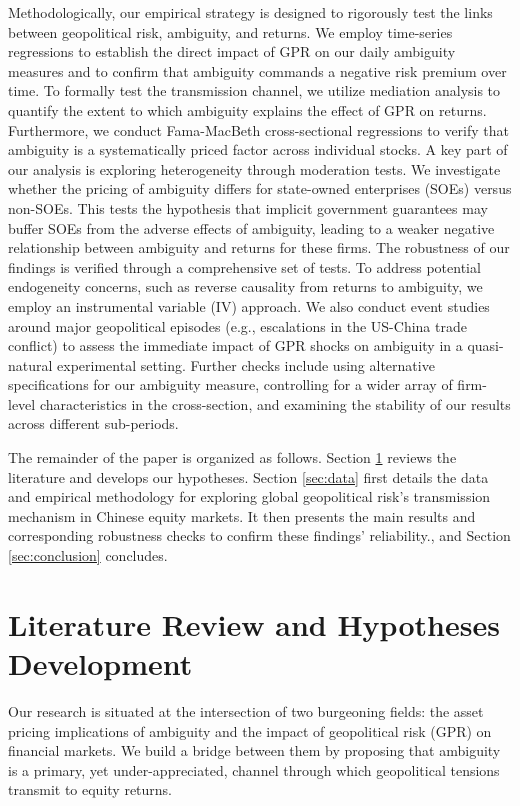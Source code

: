 \documentclass[preprint,12pt,authoryear]{elsarticle}
\begin{document}
Methodologically, our empirical strategy is designed to rigorously test the links between geopolitical risk, ambiguity, and returns. We employ time-series regressions to establish the direct impact of GPR on our daily ambiguity measures and to confirm that ambiguity commands a negative risk premium over time. To formally test the transmission channel, we utilize mediation analysis to quantify the extent to which ambiguity explains the effect of GPR on returns. Furthermore, we conduct Fama-MacBeth cross-sectional regressions to verify that ambiguity is a systematically priced factor across individual stocks. A key part of our analysis is exploring heterogeneity through moderation tests. We investigate whether the pricing of ambiguity differs for state-owned enterprises (SOEs) versus non-SOEs. This tests the hypothesis that implicit government guarantees may buffer SOEs from the adverse effects of ambiguity, leading to a weaker negative relationship between ambiguity and returns for these firms. The robustness of our findings is verified through a comprehensive set of tests. To address potential endogeneity concerns, such as reverse causality from returns to ambiguity, we employ an instrumental variable (IV) approach. We also conduct event studies around major geopolitical episodes (e.g., escalations in the US-China trade conflict) to assess the immediate impact of GPR shocks on ambiguity in a quasi-natural experimental setting. Further checks include using alternative specifications for our ambiguity measure, controlling for a wider array of firm-level characteristics in the cross-section, and examining the stability of our results across different sub-periods.

The remainder of the paper is organized as follows. Section \ref{sec:literature} reviews the literature and develops our hypotheses. Section \ref{sec:data} first details the data and empirical methodology for exploring global geopolitical risk’s transmission mechanism in Chinese equity markets. It then presents the main results and corresponding robustness checks to confirm these findings’ reliability., and Section \ref{sec:conclusion} concludes.

\section{Literature Review and Hypotheses Development}
\label{sec:literature}

Our research is situated at the intersection of two burgeoning fields: the asset pricing implications of ambiguity and the impact of geopolitical risk (GPR) on financial markets. We build a bridge between them by proposing that ambiguity is a primary, yet under-appreciated, channel through which geopolitical tensions transmit to equity returns.
\end{document}
